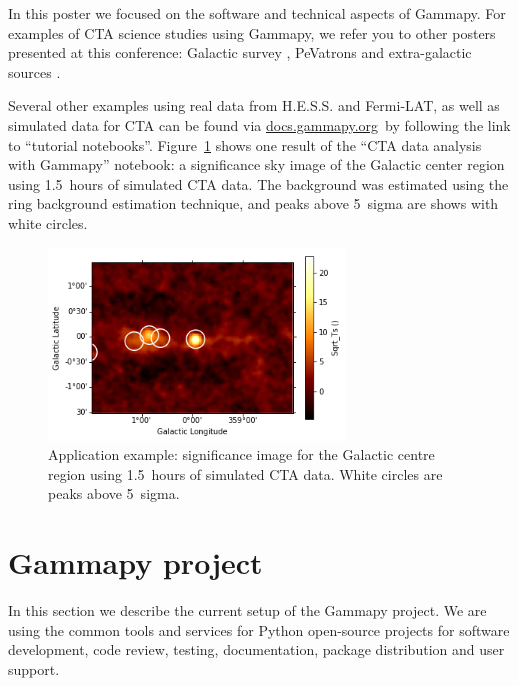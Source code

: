 \documentclass{PoS}
\newcommand{\urlGammapyDocs}{\href{http://docs.gammapy.org}{docs.gammapy.org}}
\begin{document}

In this poster we focused on the software and technical aspects of Gammapy. For
examples of CTA science studies using Gammapy, we refer you to other posters
presented at this conference: Galactic survey \cite{roberta}, PeVatrons
\cite{cyril} and extra-galactic sources \cite{julien}.

Several other examples using real data from H.E.S.S. and Fermi-LAT, as well as
simulated data for CTA can be found via \urlGammapyDocs\ by following the link
to ``tutorial notebooks''. Figure~\ref{fig:app} shows one result of the ``CTA
data analysis with Gammapy'' notebook: a significance sky image of the Galactic
center region using 1.5~hours of simulated CTA data. The background was
estimated using the ring background estimation technique, and peaks above
5~sigma are shows with white circles.

\begin{figure}[t]
\centering
\includegraphics[width=0.7\textwidth]{figures/gammapy_example_sky_image.png}
\caption{
Application example: significance image for the Galactic centre region using
1.5~hours of simulated CTA data.  White circles are peaks above 5~sigma.
}
\label{fig:app}
\end{figure}

\section{Gammapy project}
\label{sec:project}

In this section we describe the current setup of the Gammapy project. We are using the common tools and services for Python open-source projects for software
development, code review, testing, documentation, package distribution and user
support.
\end{document}
